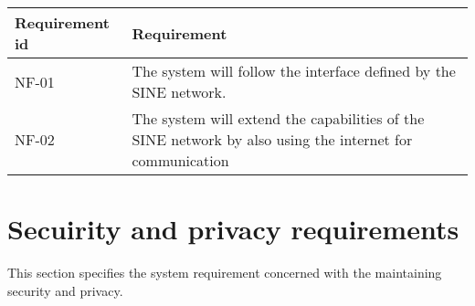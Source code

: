 \begin{longtable}{| p{3.2cm} |  p{10cm} | }
	\hline
	\textbf{Requirement id} &  \textbf{Requirement } \\
	\hline
	NF-01 & The system will follow the interface defined by the SINE network.  \\
	\hline
	NF-02 & The system will extend the capabilities of the SINE network by also using the internet for communication  \\
	\hline
\end{longtable}






\label{sec_nonFunc2}
\section{Secuirity and privacy requirements}
This section specifies the system requirement concerned with the maintaining security and privacy.

